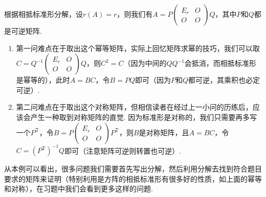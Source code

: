 \begin{solution}
    根据相抵标准形分解，设$r(A)=r$，则我们有$A=P\begin{pmatrix}
            E_r & O \\ O & O
        \end{pmatrix}Q$，其中$P$和$Q$都是可逆矩阵.
    \begin{enumerate}
        \item 第一问难点在于取出这个幂等矩阵，实际上回忆矩阵求幂的技巧，我们可以取$C=Q^{-1}\begin{pmatrix}
                      E_r & O \\ O & O
                  \end{pmatrix}Q$，则$C^2=C$（因为中间的$QQ^{-1}$会抵消，而相抵标准形是幂等的），此时$A=BC$，令$B=PQ$即可（因为$P$和$Q$都可逆，其乘积也必定可逆）.

        \item 第二问难点在于取出这个对称矩阵，但相信读者在经过上一小问的历练后，应该会产生一种取到对称矩阵的直觉. 因为标准形是对称的，我们只需要再多写一个$P^\mathrm{T}$，令$B=P\begin{pmatrix}
                      E_r & O \\ O & O
                  \end{pmatrix}P^\mathrm{T}$，则$B$是对称矩阵，且$A=BC$，令$C=(P^\mathrm{T})^{-1}Q$即可（注意矩阵可逆则转置也可逆）.
    \end{enumerate}
\end{solution}

从本例可以看出，很多问题我们需要首先写出分解，然后利用分解去找到符合题目要求的矩阵来证明（特别利用是方阵的相抵标准形有很多好的性质，如上面的幂等和对称），在习题中我们会看到更多这样的问题.

